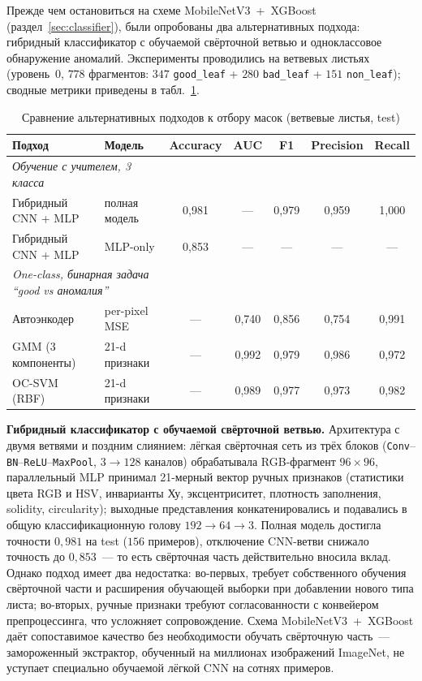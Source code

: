 Прежде чем остановиться на схеме \mbox{MobileNetV3 + XGBoost} (раздел~\ref{sec:classifier}),
были опробованы два альтернативных подхода: гибридный классификатор с обучаемой
свёрточной ветвью и одноклассовое обнаружение аномалий. Эксперименты проводились
на ветвевых листьях (уровень~0, $778$ фрагментов: $347$ \texttt{good\_leaf} +
$280$ \texttt{bad\_leaf} + $151$ \texttt{non\_leaf}); сводные метрики приведены
в табл.~\ref{tab:clf_alts}.

\begin{table}[H]
\centering
\caption{Сравнение альтернативных подходов к отбору масок (ветвевые листья, test)}
\label{tab:clf_alts}
\small
\begin{tabular}{llccccc}
\hline
\textbf{Подход} & \textbf{Модель} & \textbf{Accuracy} & \textbf{AUC}
                & \textbf{F1} & \textbf{Precision} & \textbf{Recall} \\
\hline
\multicolumn{2}{l}{\textit{Обучение с учителем, 3 класса}} & & & & & \\
Гибридный CNN + MLP   & полная модель    & 0{,}981 & ---     & 0{,}979 & 0{,}959 & 1{,}000 \\
Гибридный CNN + MLP   & MLP-only         & 0{,}853 & ---     & ---     & ---     & ---     \\
\hline
\multicolumn{2}{l}{\textit{One-class, бинарная задача ``good vs аномалия''}} & & & & & \\
Автоэнкодер           & per-pixel MSE    & ---     & 0{,}740 & 0{,}856 & 0{,}754 & 0{,}991 \\
GMM (3 компоненты)    & 21-d признаки    & ---     & 0{,}992 & 0{,}979 & 0{,}986 & 0{,}972 \\
OC-SVM (RBF)          & 21-d признаки    & ---     & 0{,}989 & 0{,}977 & 0{,}973 & 0{,}982 \\
\hline
\end{tabular}
\end{table}

\textbf{Гибридный классификатор с обучаемой свёрточной ветвью.} Архитектура
с двумя ветвями и поздним слиянием: лёгкая свёрточная сеть из трёх блоков
(\texttt{Conv}--\texttt{BN}--\texttt{ReLU}--\texttt{MaxPool}, $3 \to 128$ каналов)
обрабатывала RGB-фрагмент $96 \times 96$, параллельный MLP принимал
21-мерный вектор ручных признаков (статистики цвета RGB и HSV, инварианты Ху,
эксцентриситет, плотность заполнения, solidity, circularity); выходные
представления конкатенировались и подавались в общую классификационную голову
$192 \to 64 \to 3$. Полная модель достигла точности $0{,}981$ на test
($156$ примеров), отключение CNN-ветви снижало точность до $0{,}853$~--- то есть
свёрточная часть действительно вносила вклад. Однако подход имеет два недостатка:
во-первых, требует собственного обучения свёрточной части и расширения
обучающей выборки при добавлении нового типа листа; во-вторых, ручные признаки
требуют согласованности с конвейером препроцессинга, что усложняет сопровождение.
Схема \mbox{MobileNetV3 + XGBoost} даёт сопоставимое качество без необходимости
обучать свёрточную часть~--- замороженный экстрактор, обученный на миллионах
изображений ImageNet, не уступает специально обучаемой лёгкой CNN на сотнях
примеров.

